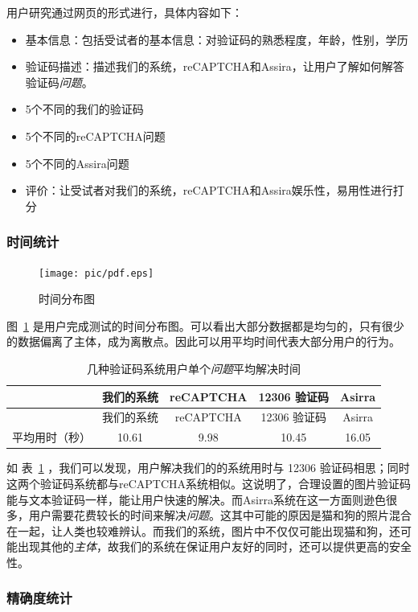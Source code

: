 \documentclass[bachelor,zhspacing]{cqu}  %
\def\tightlist{}
\begin{document}
用户研究通过网页的形式进行，具体内容如下：

\begin{itemize}
\tightlist
\item
  基本信息：包括受试者的基本信息：对验证码的熟悉程度，年龄，性别，学历
\item
  验证码描述：描述我们的系统，reCAPTCHA和Assira，让用户了解如何解答验证码\emph{问题}。
\item
  5个不同的我们的验证码
\item
  5个不同的reCAPTCHA问题
\item
  5个不同的Assira问题
\item
  评价：让受试者对我们的系统，reCAPTCHA和Assira娱乐性，易用性进行打分
\end{itemize}

\subsubsection{时间统计}\label{ux65f6ux95f4ux7edfux8ba1}

\begin{figure}[htbp]
\centering
\texttt{[image: pic/pdf.eps]}
\caption{时间分布图}\label{fig:time-distribute}
\end{figure}

图~\ref{fig:time-distribute}
是用户完成测试的时间分布图。可以看出大部分数据都是均匀的，只有很少的数据偏离了主体，成为离散点。因此可以用平均时间代表大部分用户的行为。

\begin{longtable}[]{@{}ccccc@{}}
\caption{\label{tbl:time}几种验证码系统用户单个\emph{问题}平均解决时间
}\tabularnewline
\toprule
& 我们的系统 & reCAPTCHA & 12306 验证码 & Asirra\tabularnewline
\midrule
\endfirsthead
\toprule
& 我们的系统 & reCAPTCHA & 12306 验证码 & Asirra\tabularnewline
\midrule
\endhead
平均用时（秒） & 10.61 & 9.98 & 10.45 & 16.05\tabularnewline
\bottomrule
\end{longtable}

如 表~\ref{tbl:time} ，我们可以发现，用户解决我们的的系统用时与 12306
验证码相思；同时这两个验证码系统都与reCAPTCHA系统相似。这说明了，合理设置的图片验证码能与文本验证码一样，能让用户快速的解决。而Asirra系统在这一方面则逊色很多，用户需要花费较长的时间来解决\emph{问题}。这其中可能的原因是猫和狗的照片混合在一起，让人类也较难辨认。而我们的系统，图片中不仅仅可能出现猫和狗，还可能出现其他的\emph{主体}，故我们的系统在保证用户友好的同时，还可以提供更高的安全性。

\subsubsection{精确度统计}\label{ux7cbeux786eux5ea6ux7edfux8ba1}
\end{document}
